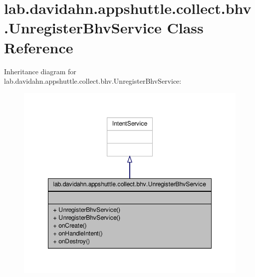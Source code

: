 \hypertarget{classlab_1_1davidahn_1_1appshuttle_1_1collect_1_1bhv_1_1_unregister_bhv_service}{\section{lab.\-davidahn.\-appshuttle.\-collect.\-bhv.\-Unregister\-Bhv\-Service \-Class \-Reference}
\label{classlab_1_1davidahn_1_1appshuttle_1_1collect_1_1bhv_1_1_unregister_bhv_service}
}


\-Inheritance diagram for lab.\-davidahn.\-appshuttle.\-collect.\-bhv.\-Unregister\-Bhv\-Service\-:
\nopagebreak
\begin{figure}[H]
\begin{center}
\leavevmode
\includegraphics[width=348pt]{classlab_1_1davidahn_1_1appshuttle_1_1collect_1_1bhv_1_1_unregister_bhv_service__inherit__graph}
\end{center}
\end{figure}


